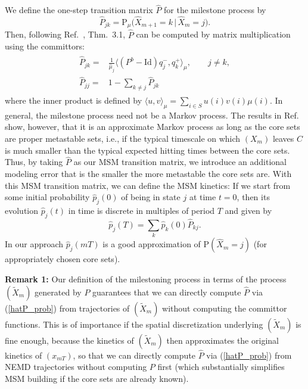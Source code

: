 \documentclass[journal=jctcce,manuscript=article]{achemso}
\newcommand{\vect}[1]{#1}
\newcommand{\fwd}[0]{+}
\newcommand{\bwd}[0]{-}
\newcommand{\id}{\mathrm{Id}}
\newcommand{\prob}{\textrm{P}}
\begin{document}
We define the one-step transition matrix $\hat{\vect P}$ for the milestone process by
\begin{equation}\label{hatP_prob}
\hat{\vect P}_{jk}=\prob_\mu\Big(\hat{X}_{m+1}=k\,\vert\, \hat{X}_m=j\Big).
\end{equation}
Then, following
Ref.~\cite{djurdjevac2010markov}, Thm.~3.1, 
$\hat{\vect P}$ can be computed by matrix multiplication using the committors:
  \begin{align}
    \label{eq:msm-tmatrix-00}
    \begin{split}      
    \hat{\vect P}_{jk}
    = &
    \frac{1}{\hat{\mu}_j}
    \langle (\vect P^b - \id) q^\bwd_j,q^\fwd_k \rangle_\mu,\qquad j\not= k, \\    %
    \hat{\vect P}_{jj}
    =&
    1-\sum_{k\not=j} \hat{\vect P}_{jk}
    \end{split}
  \end{align}
where the inner product is defined by
$\langle u,v \rangle_\mu=\sum_{i\in S} u(i) v(i) \mu(i)$. 
In general, the milestone process need not be a Markov process. The results in Ref.~\cite{A19-31,sarich2014utilizing} show, however, that it is an approximate Markov process as long as the core sets are proper metastable sets, i.e., if the typical timescale on which $(X_m)$ leaves $C$ is much smaller than the typical expected hitting times between the core sets.
Thus, by taking $\hat{P}$ as our MSM transition matrix, we introduce an additional modeling error that is the smaller the more metastable the core sets are.
With this MSM transition matrix, we can define the MSM kinetics:
If we start from some initial probability $\hat{p}_j(0)$ of being in state $j$ at time $t=0$, then its evolution $\hat{p}_j(t)$ in time is discrete in multiples of period $T$ and given by
\begin{equation}\label{eq:num-29}
\hat{p}_j(T)=\sum_k \hat{p}_k(0)\hat{\vect P}_{kj}.
\end{equation}
In our approach $\hat p_j(mT)$ is a good approximation of $\prob(\hat{X}_m=j)$ (for appropriately chosen core sets).

\textbf{Remark 1:} Our definition of the milestoning process in terms of the process $(\tilde X_m)$ generated by $P$ guarantees that we can directly compute $\hat{P}$ via (\ref{hatP_prob})  from trajectories of $(\tilde X_m)$ without computing the committor functions. 
This is of importance if the spatial discretization underlying $(\tilde X_m)$ is fine enough, because the kinetics of $(\tilde X_m)$
then approximates the original kinetics of $(x_{mT})$, so that we can directly compute   $\hat{P}$ via (\ref{hatP_prob})  from NEMD trajectories without computing $P$ first (which substantially simplifies MSM building if the core sets are already known).
\end{document}
